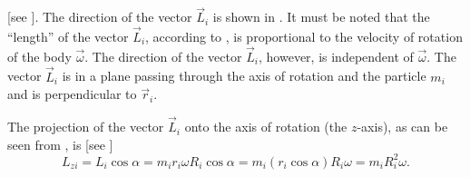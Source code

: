 \noindent
[see ]. The direction of the vector $\vec{L}_i$ is shown in . It must be noted that the ``length'' of the vector $\vec{L}_i$, according to , is proportional to the velocity of rotation of the body $\vec{\omega}$. The direction of the vector $\vec{L}_i$, however, is independent of $\vec{\omega}$. The vector $\vec{L}_i$ is in a plane passing through the axis of rotation and the particle $m_i$ and is perpendicular to $\vec{r}_i$.

The projection of the vector $\vec{L}_i$ onto the axis of rotation (the $z$-axis), as can be seen from , is [see ]
\begin{equation}\label{eq:5_9}
L_{zi} = L_i\cos\alpha = m_i r_i \omega R_i \cos\alpha = m_i(r_i\cos\alpha)R_i\omega = m_iR_i^2\omega.
\end{equation}

